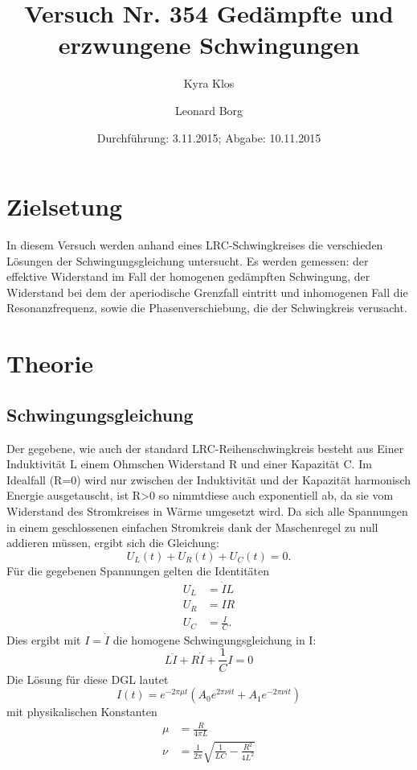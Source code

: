 \documentclass{scrartcl}
\title{Versuch Nr. 354 Gedämpfte und erzwungene Schwingungen}
\author{Kyra Klos \and Leonard Borg}
\date{Durchführung: 3.11.2015; Abgabe: 10.11.2015}
\begin{document}
    \maketitle
    \tableofcontens
    \section{Zielsetung}
    In diesem Versuch werden anhand eines LRC-Schwingkreises die verschieden Lösungen der Schwingungsgleichung untersucht.
    Es werden gemessen: der effektive Widerstand im Fall der homogenen gedämpften Schwingung,
    der Widerstand bei dem der aperiodische Grenzfall eintritt und inhomogenen Fall die Resonanzfrequenz, sowie die Phasenverschiebung,
    die der Schwingkreis verusacht.

    \section{Theorie}
    \label{sec:Theorie}
    \subsection{Schwingungsgleichung}
    \label{sub:Schwingungsgleichung}

    Der gegebene, wie auch der standard LRC-Reihenschwingkreis besteht aus Einer Induktivität L einem Ohmschen Widerstand R und einer Kapazität C.
    Im Idealfall (R=0) wird nur zwischen der Induktivität und der Kapazität harmonisch Energie ausgetauscht, ist R>0 so nimmtdiese auch exponentiell ab,
    da sie vom Widerstand des Stromkreises in Wärme umgesetzt wird.
        Da sich alle Spannungen in einem geschlossenen einfachen Stromkreis dank der Maschenregel zu null addieren müssen,
    ergibt sich die Gleichung:
        \begin{equation}
            U_L(t)+U_R(t)+U_C(t)=0.
            \label{eqn:Krichhoff2}
        \end{equation}
        Für die gegebenen Spannungen gelten die Identitäten
        \begin{align*}
            U_L &= \dot{I}L \\
            U_R &= IR  \\
            U_C &= \frac{I}{C}.
        \end{align*}
        Dies ergibt mit $I=\dot{I}$ die homogene Schwingungsgleichung in I:
        \begin{equation}
            L\ddot{I}+R\dot{I}+\frac{1}{C}I=0
            \label{eqn:Schwingungsgleichung}
        \end{equation}
        Die Lösung für diese DGL lautet
        \begin{equation}
            I(t)=e^{-2\pi\mu t}(A_0e^{2\pi\nu it}+A_1e^{-2\pi\nu it})
            \label{eqn:Fundamentalsys}
        \end{equation}
        mit physikalischen Konstanten
        \begin{align}
            \mu &= \frac{R}{4\pi L}\\
            \nu &= \frac{1}{2\pi}\sqrt{\frac{1}{LC}-\frac{R^2}{4L^2}}
        \end{align}
\end{document}
